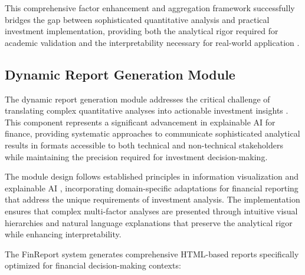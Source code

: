 \documentclass[3p,times,procedia]{elsarticle}
\begin{document}
This comprehensive factor enhancement and aggregation framework successfully bridges the gap between sophisticated quantitative analysis and practical investment implementation, providing both the analytical rigor required for academic validation and the interpretability necessary for real-world application \cite{Harvey2016,Ribeiro2016}.

\subsection{Dynamic Report Generation Module}

The dynamic report generation module addresses the critical challenge of translating complex quantitative analyses into actionable investment insights \cite{Ribeiro2016}. This component represents a significant advancement in explainable AI for finance, providing systematic approaches to communicate sophisticated analytical results in formats accessible to both technical and non-technical stakeholders while maintaining the precision required for investment decision-making.

The module design follows established principles in information visualization and explainable AI \cite{Ribeiro2016}, incorporating domain-specific adaptations for financial reporting that address the unique requirements of investment analysis. The implementation ensures that complex multi-factor analyses are presented through intuitive visual hierarchies and natural language explanations that preserve the analytical rigor while enhancing interpretability.

The FinReport system generates comprehensive HTML-based reports specifically optimized for financial decision-making contexts:
\end{document}

